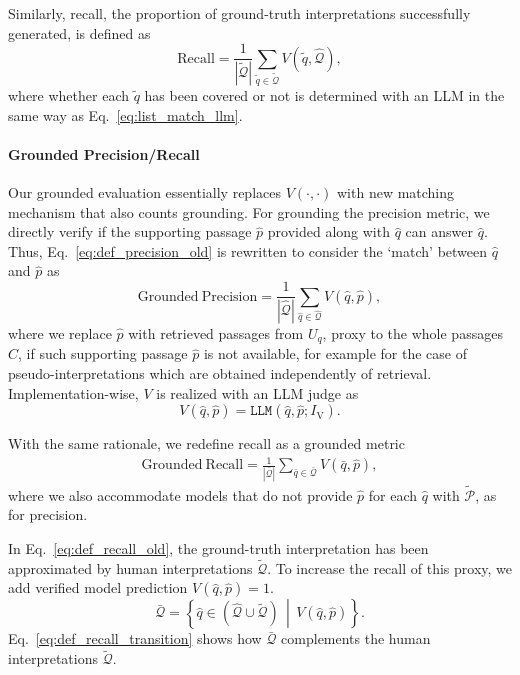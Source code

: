 Similarly, recall, the proportion of ground-truth interpretations successfully generated, is defined as
\begin{equation}
\mathrm{Recall} = \frac{1}{|\tilde{\mathcal{Q}}|} \sum_{\tilde{q}\in \tilde{\mathcal{Q}}}
V \left(\tilde{q},\hat{\mathcal{Q}}\right), 
\label{eq:def_recall_old}
\end{equation}
where whether each $\tilde{q}$ has been covered or not is determined with an LLM in the same way as Eq.~\ref{eq:list_match_llm}.

\paragraph{Grounded Precision/Recall} Our grounded evaluation essentially replaces 
$V(\cdot, \cdot)$ with new matching mechanism that also counts grounding.
For grounding the precision metric, we directly verify if the supporting passage $\hat{p}$ provided along with $\hat{q}$ can answer $\hat{q}$. 
Thus, Eq.~\ref{eq:def_precision_old} is rewritten to consider the `match' between $\hat{q}$ and $\hat{p}$ as
\begin{equation}
\mathrm{Grounded\ Precision} = \frac{1}{|\hat{\mathcal{Q}}|} \sum_{\hat{q}\in \hat{\mathcal{Q}}}
V \left(\hat{q},\hat{p}\right),
\label{eq:def_precision_transition}
\end{equation}
where we replace $\hat{p}$ with
retrieved passages from $U_q$,
proxy to the whole passages $C$,
if such supporting passage $\hat{p}$ is not available, for example for the case of pseudo-interpretations which are obtained independently of retrieval.
Implementation-wise, $V$ is realized with an LLM judge as
\begin{equation}
V(\hat{q}, \hat{p}) = \texttt{LLM}\left(\hat{q},\hat{p};I_{\textrm{V}}\right).
\end{equation}




With the same rationale, we redefine recall as a grounded metric
\begin{multline}
\mathrm{Grounded\ Recall} =
\frac{1}{|\bar{\mathcal{Q}}|} \sum_{\bar{q}\in \bar{\mathcal{Q}}}
V \left( \bar{q}, \hat{p} \right),
\label{eq:def_recall_transition}
\end{multline}
where we also accommodate models that do not provide $\hat{p}$ for each $\hat{q}$ with $\tilde{\mathcal{P}}$, as for precision.

In Eq.~\ref{eq:def_recall_old}, the ground-truth interpretation has been approximated by human interpretations $\tilde{\mathcal{Q}}$.
To increase the recall of this proxy,
we add verified model prediction $V(\hat{q},\hat{p})=1$.
\begin{equation}
\bar{\mathcal{Q}} =  \left\{ \hat{q}\in (\hat{\mathcal{Q}} \cup \tilde{\mathcal{Q}}) \,\middle|\, 
V \left(\hat{q},\hat{p}\right)\right\}.
\end{equation}
Eq.~\ref{eq:def_recall_transition} shows how
$\bar{\mathcal{Q}}$ complements the human interpretations $\tilde{\mathcal{Q}}$.


